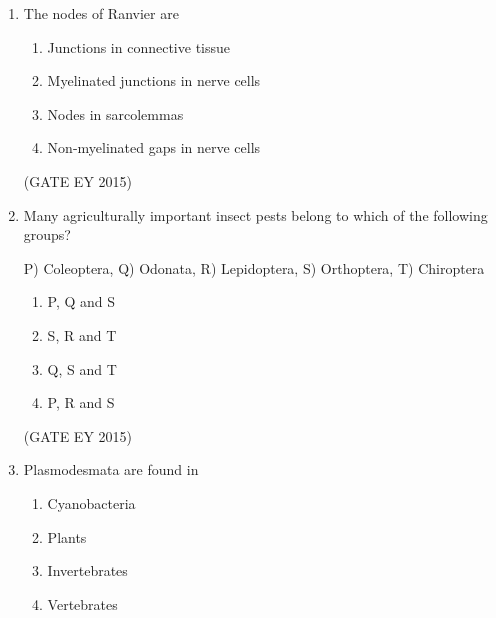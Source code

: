 \documentclass[journal,12pt,onecolumn]{IEEEtran}
\theoremstyle{remark}
\begin{document}
\begin{enumerate}
\begin{multicols}{2}
\begin{enumerate}
    
\item$ Y > Z > X$
\item$ X > Y = Z$
\item$ X > Y > Z$
\item $X < Y = Z$

    \end{enumerate}
    \end{multicols}
\hfill{(GATE EY 2015)}
\item 
The nodes of Ranvier are


\begin{enumerate}
    
\item Junctions in connective tissue
\item Myelinated junctions in nerve cells
\item Nodes in sarcolemmas
\item Non-myelinated gaps in nerve cells

    \end{enumerate}
   
\hfill{(GATE EY 2015)}
\item 
Many agriculturally important insect pests belong to which of the following groups?

P) Coleoptera, Q) Odonata, R) Lepidoptera, S) Orthoptera, T) Chiroptera

\begin{multicols}{4}
\begin{enumerate}
    
\item P, Q and S
\item S, R and T
\item Q, S and T
\item P, R and S

    \end{enumerate}
    \end{multicols}
\hfill{(GATE EY 2015)}






\item 

Plasmodesmata are found in
\begin{multicols}{4}
\begin{enumerate}
    
\item Cyanobacteria
\item Plants
\item Invertebrates
\item Vertebrates


\end{enumerate}
\end{multicols}
\end{enumerate}
\end{document}
